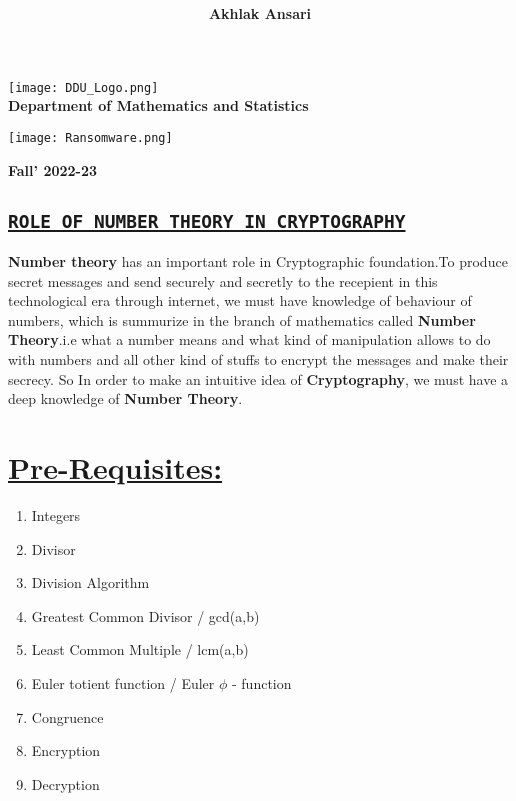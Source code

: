 \documentclass[a4paper,12pt]{article}
\title{\underline {\sc {\textbf PROJECT: NUMBER THEORY}}}
\author{\textbf{Akhlak Ansari}}
\begin{document}
    \pgfplotsset{compat=1.17}
    \color{black}

    \maketitle 

         
    
    \begin{center}
      
        \texttt{[image: DDU\_Logo.png]}\\[3mm]
        \textbf{ {\LARGE Department of Mathematics and Statistics}}

        \vspace*{1cm}

        \texttt{[image: Ransomware.png]}
       
        \vspace*{0.3cm}

        \textbf{Fall' 2022-23}

    \end{center}

    \begin{center}
        \section*{\LARGE \underline{\texttt{\textbf{ROLE OF NUMBER THEORY IN CRYPTOGRAPHY}}}}
    \end{center}

    {\bf Number theory} has an important role in Cryptographic foundation.To produce secret messages and send securely and secretly to the recepient in this technological era through internet, we must have knowledge of behaviour of numbers, which is summurize in the branch of mathematics called {\bf Number Theory}.i.e what a number means and what kind of manipulation allows to do with numbers and all other kind of stuffs to encrypt the messages and make their secrecy.
    So In order to make an intuitive idea of {\bf Cryptography}, we must have a deep knowledge of {\bf Number Theory}.


    \section*{\underline{Pre-Requisites:}}
    \par

    \begin{enumerate}
        \color{black}
        \item Integers
        \item Divisor
        \item Division Algorithm
        \item Greatest Common Divisor / gcd(a,b)
        \item Least Common Multiple / lcm(a,b)
        \item Euler totient function / Euler $\phi$ - function
        \item Congruence
        \item Encryption
        \item Decryption
    \end{enumerate}
\end{document}
